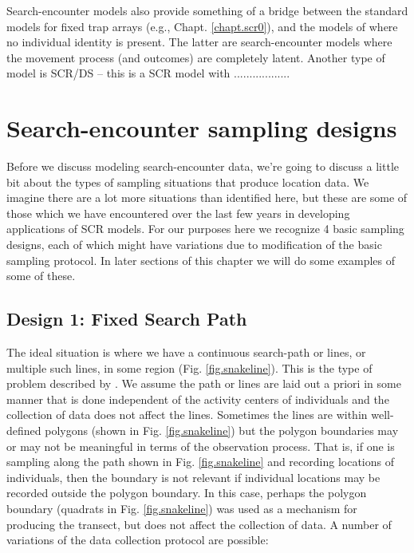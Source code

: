 Search-encounter models also provide something of a bridge between the
standard models for fixed trap arrays (e.g., Chapt. \ref{chapt.scr0}),
and the models of \citep{chandler_royle:2012} where no individual
identity is present. The latter are search-encounter models where the
movement process (and outcomes) are completely latent. Another type of
model is SCR/DS -- this is a SCR model with ..................

\section{Search-encounter sampling designs}

Before we discuss modeling search-encounter data, we're going to
discuss a little bit about the types of sampling situations that
produce location data.  We imagine there are a lot more situations
than identified here, but these are some of those which we have
encountered over the last few years in developing applications of SCR
models. 
For our purposes here we recognize 4 basic sampling designs, each of
which might have variations due to modification of the basic sampling
protocol. In later sections of this chapter we will do some examples
of some of these.

\subsection{Design 1: Fixed Search Path}

The ideal situation is where we have a continuous search-path or
lines, or multiple such lines, in some region
(Fig. \ref{fig.snakeline}). This is the type of problem described by
\citet{royle_etal:2011mee}. We assume the path or lines are laid out a
priori in some manner that is done independent of the activity centers
of individuals and the collection of data does not affect the
lines. Sometimes the lines are within well-defined polygons (shown in
Fig. \ref{fig.snakeline}) but the polygon boundaries may or may not be
meaningful in terms of the observation process. That is, if one is
sampling along the path shown in Fig. \ref{fig.snakeline} and
recording locations of individuals, then the boundary is not relevant
if individual locations may be recorded outside the polygon
boundary. In this case, perhaps the polygon boundary (quadrats in
Fig. \ref{fig.snakeline}) was used as a mechanism for producing the
transect, but does not affect the collection of data.  A number of
variations of the data collection protocol are possible:

